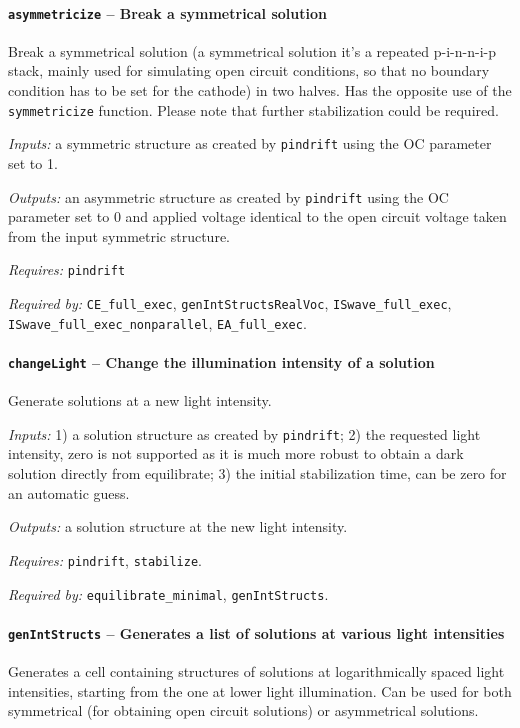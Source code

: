 		\paragraph{\texttt{asymmetricize} -- Break a symmetrical solution}\label{asymmetricize}
		Break a symmetrical solution (a symmetrical solution it's a repeated p-i-n-n-i-p stack, mainly used for simulating open circuit conditions, so that no boundary condition has to be set for the cathode) in two halves. Has the opposite use of the \texttt{symmetricize} function.
		Please note that further stabilization could be required.
		
		\textit{Inputs:} a symmetric structure as created by \texttt{pindrift} using the OC parameter set to 1.
		
		\textit{Outputs:} an asymmetric structure as created by \texttt{pindrift} using the OC
		     parameter set to 0 and applied voltage identical to the open circuit
		     voltage taken from the input symmetric structure.
		     
	\textit{Requires:} \texttt{pindrift}
	
	\textit{Required by:} \texttt{CE\_full\_exec}, \texttt{gen\-Int\-Structs\-Real\-Voc}, \texttt{ISwave\_full\_exec}, \texttt{ISwave\_full\_exec\_nonparallel}, \texttt{EA\_full\_exec}.

		\paragraph{\texttt{change\-Light} -- Change the illumination intensity of a solution}
		Generate solutions at a new light intensity.
		
		\textit{Inputs:} 1) a solution structure as created by \texttt{pindrift};
		2) the requested light intensity, zero is not supported as it is
		    much more robust to obtain a dark solution directly from equilibrate;
		3) the initial stabilization time, can be zero for an automatic
		     guess.
		     
		\textit{Outputs:} a solution structure at the new light intensity.
		
		\textit{Requires:} \texttt{pindrift}, \texttt{stabilize}.
		
			\textit{Required by:} \texttt{equilibrate\_minimal}, \texttt{gen\-Int\-Structs}.
			
		\paragraph{\texttt{gen\-Int\-Structs} -- Generates a list of solutions at various light intensities}\label{genIntStructs}
Generates a cell containing structures of solutions at logarithmically spaced light intensities, starting from the one at lower light illumination. Can be used for both symmetrical (for obtaining open circuit solutions) or asymmetrical solutions.

